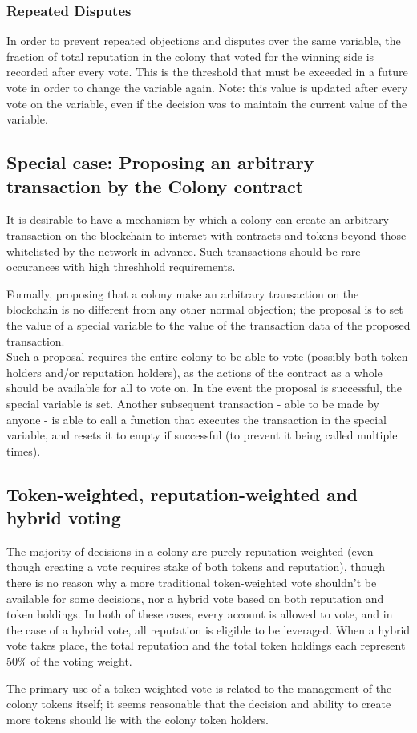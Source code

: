 \subsubsection{Repeated Disputes}\label{sec:repeated-disputes}
In order to prevent repeated objections and disputes over the same variable, the fraction of total reputation in the colony that voted for the winning side is recorded after every vote. This is the threshold that must be exceeded in a future vote in order to change the variable again. Note: this value is updated after every vote on the variable, even if the decision was to maintain the current value of the variable.



\subsection{Special case: Proposing an arbitrary transaction by the Colony contract}
It is desirable to have a mechanism by which a colony can create an arbitrary transaction on the blockchain to interact with contracts and tokens beyond those whitelisted by the network in advance. Such transactions should be rare occurances with high threshhold requirements.

Formally, proposing that a colony make an arbitrary transaction on the blockchain is no different from any other normal objection; the proposal is to set the value of a special variable to the value of the transaction data of the proposed transaction.\\
Such a proposal requires the entire colony to be able to vote (possibly both token holders and/or reputation holders), as the actions of the contract as a whole should be available for all to vote on. In the event the proposal is successful, the special variable is set. Another subsequent transaction - able to be made by anyone - is able to call a function that executes the transaction in the special variable, and resets it to empty if successful (to prevent it being called multiple times).

\subsection{Token-weighted, reputation-weighted and hybrid voting}
The majority of decisions in a colony are purely reputation weighted (even though creating a vote requires stake of both tokens and reputation), though there is no reason why a more traditional token-weighted vote shouldn't be available for some decisions, nor a hybrid vote based on both reputation and token holdings. In both of these cases, every account is allowed to vote, and in the case of a hybrid vote, all reputation is eligible to be leveraged. When a hybrid vote takes place, the total reputation and the total token holdings each represent 50\% of the voting weight.

The primary use of a token weighted vote is related to the management of the colony tokens itself; it seems reasonable that the decision and ability to create more tokens should lie with the colony token holders.
